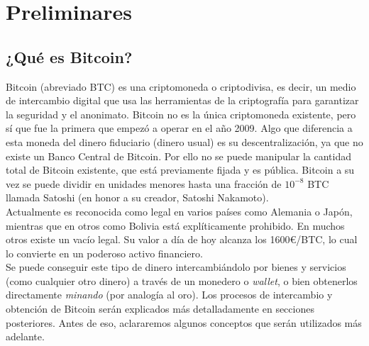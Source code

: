 \documentclass[twoside]{article}
\theoremstyle{definition}
\begin{document}
\newpage


\section{Preliminares}

\subsection{¿Qué es Bitcoin?}

Bitcoin (abreviado BTC) es una criptomoneda o criptodivisa, es decir, un medio de intercambio digital que usa las herramientas de la criptografía para garantizar la seguridad y el anonimato. Bitcoin no es la única criptomoneda existente, pero sí que fue la primera que empezó a operar en el año 2009. Algo que diferencia a esta moneda del dinero fiduciario (dinero usual) es su descentralización, ya que no existe un Banco Central de Bitcoin. Por ello no se puede manipular la cantidad total de Bitcoin existente, que está previamente fijada y es pública. Bitcoin a su vez se puede dividir en unidades menores hasta una fracción de $10^{-8}$ BTC llamada Satoshi (en honor a su creador, Satoshi Nakamoto).\\

Actualmente es reconocida como legal en varios países como Alemania o Japón, mientras que en otros como Bolivia está explíticamente prohibido. En muchos otros existe un vacío legal. Su valor a día de hoy alcanza los 1600\euro/BTC, lo cual lo convierte en un poderoso activo financiero. \\

Se puede conseguir este tipo de dinero intercambiándolo por bienes y servicios (como cualquier otro dinero) a través de un monedero o \emph{wallet}, o bien obtenerlos directamente \emph{minando} (por analogía al oro). Los procesos de intercambio y obtención de Bitcoin serán explicados más detalladamente en secciones posteriores. Antes de eso, aclararemos algunos conceptos que serán utilizados más adelante. 
\end{document}
